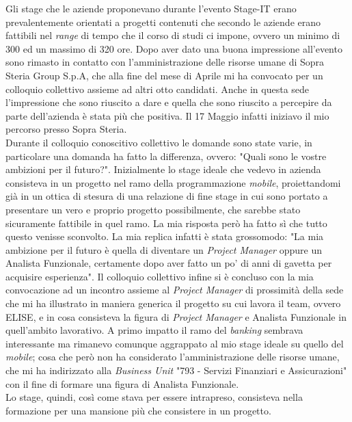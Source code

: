 Gli stage che le aziende proponevano durante l'evento Stage-IT erano prevalentemente orientati a progetti contenuti che secondo le aziende erano fattibili nel \textit{range} di tempo che il corso di studi ci impone, ovvero un minimo di 300 ed un massimo di 320 ore. Dopo aver dato una buona impressione all'evento sono rimasto in contatto con l'amministrazione delle risorse umane di Sopra Steria Group S.p.A, che alla fine del mese di Aprile mi ha convocato per un colloquio collettivo assieme ad altri otto candidati. Anche in questa sede l'impressione che sono riuscito a dare e quella che sono riuscito a percepire da parte dell'azienda è stata più che positiva. Il 17 Maggio infatti iniziavo il mio percorso presso Sopra Steria.\\

Durante il colloquio conoscitivo collettivo le domande sono state varie, in particolare una domanda ha fatto la differenza, ovvero: "Quali sono le vostre ambizioni per il futuro?". Inizialmente lo stage ideale che vedevo in azienda consisteva in un progetto nel ramo della programmazione \textit{mobile}, proiettandomi già in un ottica di stesura di una relazione di fine stage in cui sono portato a presentare un vero e proprio progetto possibilmente, che sarebbe stato sicuramente fattibile in quel ramo. La mia risposta però ha fatto sì che tutto questo venisse sconvolto. La mia replica infatti è stata grossomodo: "La mia ambizione per il futuro è quella di diventare un \textit{Project Manager} oppure un Analista Funzionale, certamente dopo aver fatto un po' di anni di gavetta per acquisire esperienza". Il colloquio collettivo infine si è concluso con la mia convocazione ad un incontro assieme al \textit{Project Manager} di prossimità della sede che mi ha illustrato in maniera generica il progetto su cui lavora il team, ovvero ELISE\glossario, e in cosa consisteva la figura di \textit{Project Manager} e Analista Funzionale in quell'ambito lavorativo. A primo impatto il ramo del \textit{banking} sembrava interessante ma rimanevo comunque aggrappato al mio stage ideale su quello del \textit{mobile}; cosa che però non ha considerato l'amministrazione delle risorse umane, che mi ha indirizzato alla \textit{Business Unit} "793 - Servizi Finanziari e Assicurazioni" con il fine di formare una figura di Analista Funzionale.\\

Lo stage, quindi, così come stava per essere intrapreso, consisteva nella formazione per una mansione più che consistere in un progetto.\\


